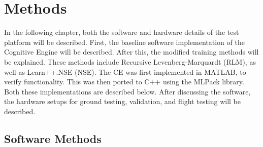 \chapter{Methods}
\par In the following chapter, both the software and hardware details of the test platform will be described. First, the baseline software implementation of the Cognitive Engine will be described. After this, the modified training methods will be explained. These methods include Recursive Levenberg-Marquardt (RLM), as well as Learn++.NSE (NSE). The CE was first implemented in MATLAB, to verify functionality. This was then ported to C++ using the MLPack library. Both these implementations are described below. After discussing the software, the hardware setups for ground testing, validation, and flight testing will be described.
\section{Software Methods}

